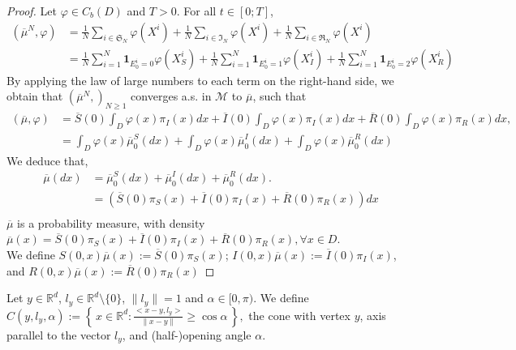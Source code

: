\documentclass[notitlepage,reqno,11pt]{amsart}
\numberwithin{equation}{section}
\begin{document}
\begin{proof}
Let $\varphi \in C_b(D)$ and $T>0$. For all $t\in[0;T]$,
\begin{align*}
(\overline{\mu}^{N},\varphi)&=\frac{1}{N}\sum_{i\in\mathfrak{S}_N}\varphi(X^{i})+ \frac{1}{N}\sum_{i\in\mathfrak{I}_N}\varphi(X^{i})+ \frac{1}{N}\sum_{i\in\mathfrak{R}_N}\varphi(X^{i})\\
&=\frac{1}{N}\sum_{i=1}^N\mathbf{1}_{E_0^i=0}\varphi(X_S^{i})+ \frac{1}{N}\sum_{i=1}^N\mathbf{1}_{E_0^i=1}\varphi(X_I^{i})+ \frac{1}{N}\sum_{i=1}^N\mathbf{1}_{E_0^i=2}\varphi(X_R^{i})
\end{align*}
By applying the law of large numbers to each term on the right-hand side, we obtain  that $(\overline{\mu}^{N}, )_{N \geq 1}$ converges a.s. in  $\mathcal{M}$ to $\overline{\mu}$, such that
\begin{align*}
(\overline{\mu},\varphi)&=\overline{S}(0)\int_{D}\varphi(x)\pi_I(x)dx+ \overline{I}(0)\int_{D}\varphi(x)\pi_I(x)dx+ \overline{R}(0)\int_{D}\varphi(x)\pi_R(x)dx,\\
&=\int_{D}\varphi(x)\overline{\mu}^S_0(dx)+ \int_{D}\varphi(x)\overline{\mu}^I_0(dx)+ \int_{D}\varphi(x)\overline{\mu}^R_0(dx)
\end{align*}
We deduce that,
\begin{align*}
\overline{\mu}(dx)&=\overline{\mu}^S_0(dx)+\overline{\mu}^I_0(dx)+\overline{\mu}^R_0(dx).\nonumber\\
&= \left(\overline{S}(0)\pi_S(x)+\overline{I}(0)\pi_I(x)+\overline{R}(0)\pi_R(x)\right)dx\\
\end{align*}
$\overline{\mu}$ is a probability measure, with density $\overline{\mu}(x)= \overline{S}(0)\pi_S(x)+\overline{I}(0)\pi_I(x)+\overline{R}(0)\pi_R(x), \forall x\in D$.\\
We define $S(0,x)\overline{\mu}(x):=\overline{S}(0)\pi_S(x)$; $I(0,x)\overline{\mu}(x):=\overline{I}(0)\pi_I(x)$, and $R(0,x)\overline{\mu}(x):=\overline{R}(0)\pi_R(x)$
\end{proof}
Let $y \in \mathbb{R}^d$, $l_y \in \mathbb{R}^d \setminus \{0\}$, $\|l_y\|=1$ and $\alpha \in [0,\pi)$. We define $C(y,l_y,\alpha):= \left\{\, x \in \mathbb{R}^d : 
\frac{<x - y,l_y>}{\|x - y\|} \ge \cos \alpha \,\right\},$
the cone with vertex $y$, axis parallel to the vector \(l_y\), and (half-)opening angle \(\alpha\).
\end{document}
